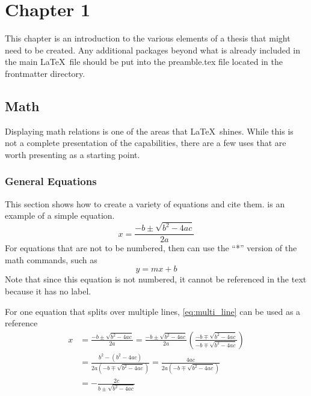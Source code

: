 \chapter{Chapter 1} \label{sec:ExampleUsage}
This chapter is an introduction to the various elements of a thesis that might need to be created.
Any additional packages beyond what is already included in the main \LaTeX\ file should be put into the preamble.tex file located in the frontmatter directory.

\section{Math} \label{sec:Math}
Displaying math relations is one of the areas that \LaTeX\ shines.
While this is not a complete presentation of the capabilities, there are a few uses that are worth presenting as a starting point.

\subsection{General Equations}
This section shows how to create a variety of equations and cite them.
 is an example of a simple equation.
\begin{equation} \label{eq:quadratic_formula}
	x=\frac{-b\pm\sqrt{b^2-4ac}}{2a}
\end{equation}
For equations that are not to be numbered, then can use the ``*'' version of the math commands, such as
\begin{equation*}
	y=mx+b
\end{equation*}
Note that since this equation is not numbered, it cannot be referenced in the text because it has no label.

For one equation that splits over multiple lines, \cref{eq:multi_line} can be used as a reference
\begin{equation} \label{eq:multi_line}
	\begin{split}
		x & =\frac{-b\pm\sqrt{b^2-4ac}}{2a}
		=\frac{-b\pm\sqrt{b^2-4ac}}{2a}\left(\frac{-b\mp\sqrt{b^2-4ac}}{-b\mp\sqrt{b^2-4ac}}\right) \\
		  & =\frac{b^2-\left(b^2-4ac\right)}{2a\left(-b\mp\sqrt{b^2-4ac}\right)}
		=\frac{4ac}{2a\left(-b\mp\sqrt{b^2-4ac}\right)}                                             \\
		  & =-\frac{2c}{b \pm \sqrt{b^2-4ac}}
	\end{split}
\end{equation}

